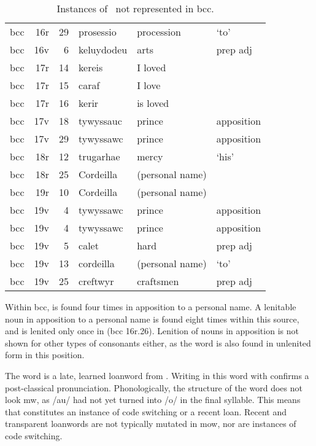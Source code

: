 \begin{table}[h]
  \centering
  \caption{Instances of \lT\ not represented in \acrshort{bcc}.}
  \label{tab:ltnotrepbcc}
  \begin{tabular}{lddwql}
    \toprule
     &  &  &  &  &  \\
    \midrule
    \gls{bcc} & 16r & 29 & prosessio & procession &  ‘to' \\
    \gls{bcc} & 16v & 6 & keluydodeu & arts & prep adj \\
    \gls{bcc} & 17r & 14 & kereis & I loved &  \\
    \gls{bcc} & 17r & 15 & caraf & I love &  \\
    \gls{bcc} & 17r & 16 & kerir & is loved &  \\
    \gls{bcc} & 17v & 18 & tywyssauc & prince & apposition \\
    \gls{bcc} & 17v & 29 & tywyssawc & prince & apposition \\
    \gls{bcc} & 18r & 12 & trugarhae & mercy &  ‘his' \\
    \gls{bcc} & 18r & 25 & Cordeilla & (personal name) &  \\
    \gls{bcc} & 19r & 10 & Cordeilla & (personal name) &  \\
    \gls{bcc} & 19v & 4 & tywyssawc & prince & apposition \\
    \gls{bcc} & 19v & 4 & tywyssawc & prince & apposition \\
    \gls{bcc} & 19v & 5 & calet & hard & prep adj \\
    \gls{bcc} & 19v & 13 & cordeilla & (personal name) &  ‘to' \\
    \gls{bcc} & 19v & 25 & creftwyr & craftsmen & prep adj \\
    \bottomrule
  \end{tabular}%
\end{table}

Within \gls{bcc},  is found four times in apposition to a personal name.
A lenitable noun in apposition to a personal name is found eight times within this source, and is lenited only once in  (\gls{bcc} 16r.26).
Lenition of nouns in apposition is not shown for other types of consonants either, as the word  is also found in unlenited form in this position.

The word  is a late, learned loanword from .
Writing  in this word with  confirms a post-classical pronunciation.
Phonologically, the structure of the word does not look \gls{mw}, as /au/ had not yet turned into /o/ in the final syllable.
This means that  constitutes an instance of code switching or a recent loan.
Recent and transparent loanwords are not typically mutated in \gls{mow}, nor are instances of code switching.

